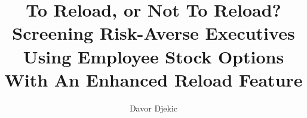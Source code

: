 \documentclass[12pt]{article}
\title{To Reload, or Not To Reload? \\ Screening Risk-Averse Executives Using Employee Stock Options With An Enhanced Reload Feature}
\author{Davor Djekic}
\begin{document}
    \maketitle
    \newpage

    \tableofcontents


    
    
    
    
    

    \nocite{*}
    \printbibliography

\end{document}
